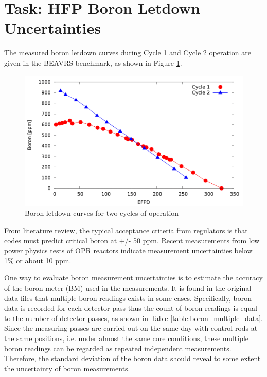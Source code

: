 \documentclass{article}
\begin{document}
\section{Task: HFP Boron Letdown Uncertainties}
The measured boron letdown curves during Cycle 1 and Cycle 2 operation are given in the BEAVRS benchmark, as shown in Figure \ref{fig:fig_boron_letdown}.

\begin{figure}[ht]
\centering
\includegraphics[keepaspectratio, width = 4.0 in]{figures/boron_letdown}
\caption{Boron letdown curves for two cycles of operation}
\label{fig:fig_boron_letdown}
\end{figure}

From literature review, the typical acceptance criteria from regulators is that codes must predict critical boron at +/- 50 ppm.  Recent measurements from low power physics tests of OPR reactors indicate measurement uncertainties below 1\% or about 10 ppm.

One way to evaluate boron measurement uncertainties is to estimate the accuracy of the boron meter (BM) used in the measurements. It is found in the original data files that multiple boron readings exists in some cases. Specifically, boron data is recorded for each detector pass thus the count of boron readings is equal to the number of detector passes, as shown in Table \ref{table:boron_multiple_data}. Since the measuring passes are carried out on the same day with control rods at the same positions, i.e. under almost the same core conditions, these multiple boron readings can be regarded as repeated independent measurements. Therefore, the standard deviation of the boron data should reveal to some extent the uncertainty of boron measurements.
\end{document}
